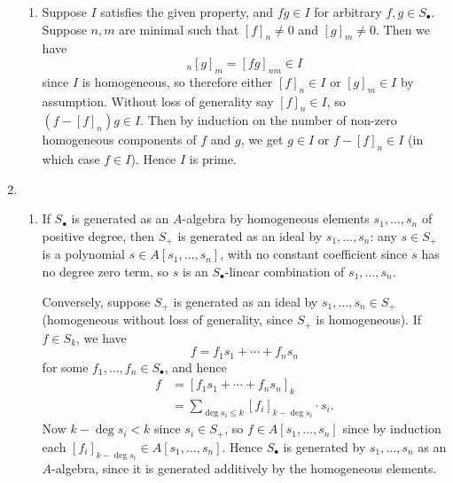 \documentclass{report}
\begin{document}
\begin{enumerate}[label=\textbf{4.5.\Alph*.}]
\begin{enumerate}[label=(\alph*)]
		      \item Suppose $I$ satisfies the given property, and $fg\in I$ for
		            arbitrary $f,g\in S_\bullet$. Suppose $n,m$ are minimal such
		            that $[f]_n\ne0$ and $[g]_m\ne0$. Then we have
		            \begin{equation*}
			            [f]_n[g]_m = [fg]_{nm} \in I
		            \end{equation*}
		            since $I$ is homogeneous, so therefore either $[f]_n\in I$ or
		            $[g]_m\in I$ by assumption. Without loss of generality say
		            $[f]_n\in I$, so $(f-[f]_n)g\in I$. Then by induction on the
		            number of non-zero homogeneous components of $f$ and $g$, we get
		            $g\in I$ or $f-[f]_n\in I$ (in which case $f\in I$). Hence $I$
		            is prime.
	      \end{enumerate}

	\item
	      \begin{enumerate}[label=(\alph*)]
		      \item If $S_\bullet$ is generated as an $A$-algebra by homogeneous
		            elements $s_1,\ldots,s_n$ of positive degree, then $S_+$ is
		            generated as an ideal by $s_1,\ldots,s_n$: any $s\in S_+$ is a
		            polynomial $s\in A[s_1,\ldots,s_n]$, with no constant
		            coefficient since $s$ has no degree zero term, so $s$ is an
		            $S_\bullet$-linear combination of $s_1,\ldots,s_n$.

		            Conversely, suppose $S_+$ is generated as an ideal by
		            $s_1,\ldots,s_n\in S_+$ (homogeneous without loss of generality,
		            since $S_+$ is homogeneous). If $f\in S_k$, we have
		            \begin{equation*}
			            f = f_1s_1 + \cdots + f_ns_n
		            \end{equation*}
		            for some $f_1,\ldots,f_n\in S_\bullet$, and hence
		            \begin{align*}
			            f
			             & = [f_1s_1 + \cdots + f_ns_n]_k                     \\
			             & = \sum_{\deg s_i\le k}[f_i]_{k-\deg s_i}\cdot s_i.
		            \end{align*}
		            Now $k-\deg s_i<k$ since $s_i\in S_+$, so
		            $f\in A[s_1,\ldots,s_n]$ since by induction each
		            $[f_i]_{k-\deg s_i}\in A[s_1,\ldots,s_n]$. Hence $S_\bullet$ is
		            generated by $s_1,\ldots,s_n$ as an $A$-algebra, since it is
		            generated additively by the homogeneous elements.


\end{enumerate}
\end{enumerate}
\end{document}
